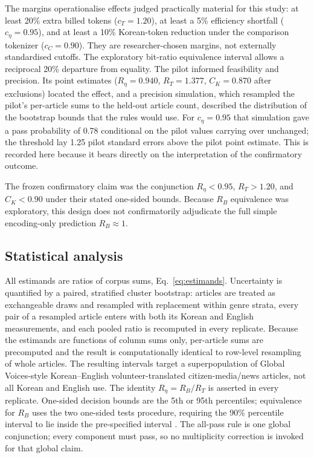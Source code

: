 \documentclass[11pt,a4paper]{article}
\newcommand{\RT}{R_{T}}
\newcommand{\RB}{R_{B}}
\newcommand{\Reta}{R_{\eta}}
\newcommand{\CK}{C_{K}}
\begin{document}
The margins operationalise effects judged practically material for this
study: at least 20\% extra billed tokens ($c_T=1.20$), at least a 5\%
efficiency shortfall ($c_\eta=0.95$), and at least a 10\% Korean-token
reduction under the comparison tokenizer ($c_C=0.90$). They are
researcher-chosen margins, not externally standardised cutoffs. The
exploratory bit-ratio equivalence interval allows a reciprocal 20\% departure
from equality. The pilot informed feasibility and precision. Its point estimates
($\Reta=0.940$, $\RT=1.377$, $\CK=0.870$ after exclusions) located the
effect, and a precision simulation, which resampled the pilot's per-article
sums to the held-out article count, described the distribution of the
bootstrap bounds that the rules would use. For $c_\eta=0.95$ that
simulation gave a pass probability of 0.78 conditional on the pilot values
carrying over unchanged; the threshold lay 1.25 pilot standard errors above
the pilot point estimate. This is recorded here because it bears directly on
the interpretation of the confirmatory outcome.

The frozen confirmatory claim was the conjunction $\Reta<0.95$,
$\RT>1.20$, and $\CK<0.90$ under their stated one-sided bounds. Because
$\RB$ equivalence was exploratory, this design does not confirmatorily
adjudicate the full simple encoding-only prediction $\RB\approx1$.

\subsection{Statistical analysis}

All estimands are ratios of corpus sums, Eq.~\eqref{eq:estimands}.
Uncertainty is quantified by a paired, stratified cluster bootstrap:
articles are treated as exchangeable draws and resampled with replacement
within genre strata, every pair of a
resampled article enters with both its Korean and English measurements, and
each pooled ratio is recomputed in every replicate. Because the estimands are
functions of column sums only, per-article sums are precomputed and the
result is computationally identical to row-level resampling of whole
articles. The resulting intervals target a superpopulation of Global
Voices-style Korean--English volunteer-translated citizen-media/news
articles, not all Korean and English use. The identity $\Reta=\RB/\RT$ is asserted in every
replicate. One-sided decision bounds are the 5th or 95th percentiles;
equivalence for $\RB$ uses the two one-sided tests procedure, requiring the
90\% percentile interval to lie inside the pre-specified interval
\citep{schuirmann1987}. The all-pass rule is one global conjunction; every
component must pass, so no multiplicity correction is invoked for that global
claim.
\end{document}
